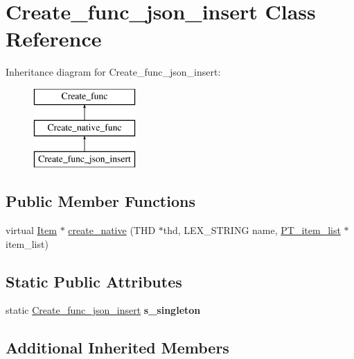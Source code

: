 \hypertarget{classCreate__func__json__insert}{}\section{Create\+\_\+func\+\_\+json\+\_\+insert Class Reference}
\label{classCreate__func__json__insert}
Inheritance diagram for Create\+\_\+func\+\_\+json\+\_\+insert\+:\begin{figure}[H]
\begin{center}
\leavevmode
\includegraphics[height=3.000000cm]{classCreate__func__json__insert}
\end{center}
\end{figure}
\subsection*{Public Member Functions}
\begin{DoxyCompactItemize}
\item 
virtual \mbox{\hyperlink{classItem}{Item}} $\ast$ \mbox{\hyperlink{classCreate__func__json__insert_ab7967512618da859ff114954f094d605}{create\+\_\+native}} (T\+HD $\ast$thd, L\+E\+X\+\_\+\+S\+T\+R\+I\+NG name, \mbox{\hyperlink{classPT__item__list}{P\+T\+\_\+item\+\_\+list}} $\ast$item\+\_\+list)
\end{DoxyCompactItemize}
\subsection*{Static Public Attributes}
\begin{DoxyCompactItemize}
\item 
\mbox{\label{classCreate__func__json__insert_a92bf0abe01f3a7ca8e7ad46a4b64c4ef}} 
static \mbox{\hyperlink{classCreate__func__json__insert}{Create\+\_\+func\+\_\+json\+\_\+insert}} {\bfseries s\+\_\+singleton}
\end{DoxyCompactItemize}
\subsection*{Additional Inherited Members}


